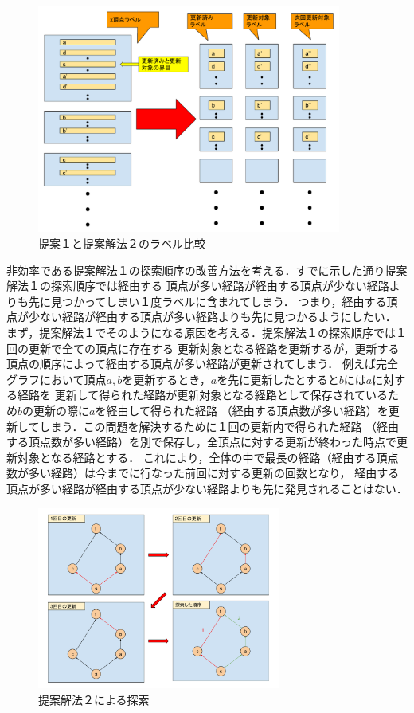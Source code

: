 \documentclass[12pt]{optlab-bachelor}
\begin{document}
\begin{figure}[htbp]
  \centering
  \caption{提案１と提案解法２のラベル比較}
  \includegraphics[width=10.0cm]{fig/fig8.pdf}
\end{figure}

非効率である提案解法１の探索順序の改善方法を考える．すでに示した通り提案解法１の探索順序では経由する
頂点が多い経路が経由する頂点が少ない経路よりも先に見つかってしまい１度ラベルに含まれてしまう．
つまり，経由する頂点が少ない経路が経由する頂点が多い経路よりも先に見つかるようにしたい．
まず，提案解法１でそのようになる原因を考える．提案解法１の探索順序では１回の更新で全ての頂点に存在する
更新対象となる経路を更新するが，更新する頂点の順序によって経由する頂点が多い経路が更新されてしまう．
例えば完全グラフにおいて頂点$a,b$を更新するとき，$a$を先に更新したとすると$b$には$a$に対する経路を
更新して得られた経路が更新対象となる経路として保存されているため$b$の更新の際に$a$を経由して得られた経路
（経由する頂点数が多い経路）を更新してしまう．この問題を解決するために１回の更新内で得られた経路
（経由する頂点数が多い経路）を別で保存し，全頂点に対する更新が終わった時点で更新対象となる経路とする．
これにより，全体の中で最長の経路（経由する頂点数が多い経路）は今までに行なった前回に対する更新の回数となり，
経由する頂点が多い経路が経由する頂点が少ない経路よりも先に発見されることはない．

\begin{figure}[htbp]
  \centering
  \caption{提案解法２による探索}
  \includegraphics[height=6.0cm, width=8.0cm]{fig/fig7.pdf}
\end{figure}
\end{document}
